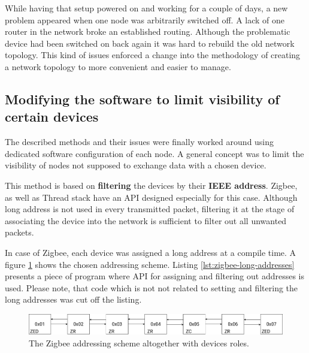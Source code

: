 While having that setup powered on and working for a couple of days, a new 
problem appeared when one node was arbitrarily switched off. A lack of
one router in the network broke an established routing. Although the problematic
device had been switched on back again it was hard to rebuild the old network
topology. This kind of issues enforced a change into the methodology of
creating a network topology to more convenient and easier to manage.

\subsection*{Modifying the software to limit visibility of certain devices}
The described methods and their issues were finally 
worked around using dedicated software configuration of each node. A general 
concept was to limit the visibility of nodes not supposed to exchange data 
with a chosen device.

This method is based on  \textbf{filtering} the devices by their \textbf{IEEE address}.
Zigbee, as well as Thread stack have an API designed especially for this case.
Although long address is not used in every transmitted packet, filtering it
at the stage of associating the device into the network is sufficient to filter
out all unwanted packets.

In case of Zigbee, each device was assigned a long address at a compile time.
A figure \ref{fig:long_address} shows the chosen addressing scheme. Listing 
\ref{lst:zigbee-long-addresses} presents a piece of program where API
for assigning and filtering out addresses is used.  Please note, that
code which  is not not related to setting and filtering the long addresses was cut off the listing.

\begin{figure}[H]
    \centering
    \includegraphics[scale=0.32]{images/zigbee-ieee-address.drawio.png}
    \caption{The Zigbee addressing scheme altogether with devices roles.}
    \label{fig:long_address}
\end{figure}

